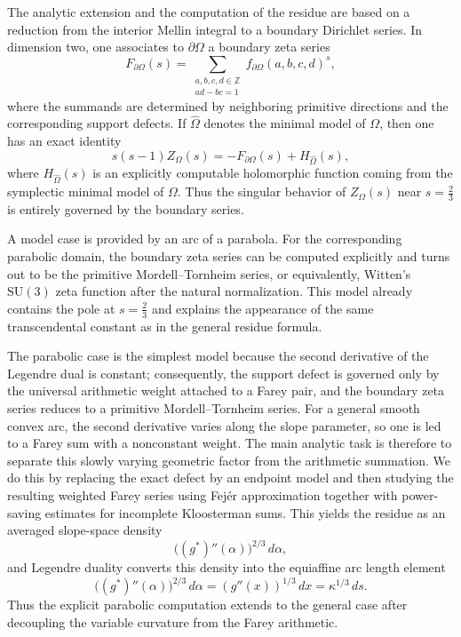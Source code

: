 \documentclass[a4paper,american,11pt]{amsart}
\theoremstyle{plain}
\theoremstyle{definition}
\newcommand{\Z}{\mathbb Z}
\begin{document}
The analytic extension and the computation of the residue are based on a
reduction from the interior Mellin integral to a boundary Dirichlet series. In
dimension two, one associates to \(\partial\Omega\) a boundary zeta series
\[
F_{\partial\Omega}(s)
=
\sum_{\substack{a,b,c,d\in\Z\\ ad-bc=1}}
f_{\partial\Omega}(a,b,c,d)^s,
\]
where the summands are determined by neighboring primitive directions and the
corresponding support defects. If \(\widehat\Omega\) denotes the minimal model
of \(\Omega\), then one has an exact identity
\[
s(s-1)Z_\Omega(s)
=
-
F_{\partial\Omega}(s)+H_{\widehat\Omega}(s),
\]
where \(H_{\widehat\Omega}(s)\) is an explicitly computable holomorphic
function coming from the symplectic minimal model of \(\Omega\). Thus the
singular behavior of \(Z_\Omega(s)\) near \(s=\frac{2}{3}\) is entirely
governed by the boundary series.

A model case is provided by an arc of a parabola. For the corresponding
parabolic domain, the boundary zeta series can be computed explicitly and
turns out to be the primitive Mordell--Tornheim series, or equivalently,
Witten's \(\mathrm{SU}(3)\) zeta function after the natural normalization. This model
already contains the pole at \(s=\tfrac23\) and explains the appearance of the
same transcendental constant as in the general residue formula.

The parabolic case is the simplest model because the second derivative of the
Legendre dual is constant; consequently, the support defect is governed only
by the universal arithmetic weight attached to a Farey pair, and the boundary
zeta series reduces to a primitive Mordell--Tornheim series. For a general
smooth convex arc, the second derivative varies along the slope parameter, so
one is led to a Farey sum with a nonconstant weight. The main analytic task is
therefore to separate this slowly varying geometric factor from the arithmetic
summation. We do this by replacing the exact defect by an endpoint model and
then studying the resulting weighted Farey series using Fej\'er approximation
together with power-saving estimates for incomplete Kloosterman sums. This
yields the residue as an averaged slope-space density
\[
\bigl((g^\ast)''(\alpha)\bigr)^{2/3}\,d\alpha,
\]
and Legendre duality converts this density into the equiaffine arc length
element
\[
\bigl((g^\ast)''(\alpha)\bigr)^{2/3}\,d\alpha
=
(g''(x))^{1/3}\,dx
=
\kappa^{1/3}\,ds.
\]
Thus the explicit parabolic computation extends to the general case after
decoupling the variable curvature from the Farey arithmetic.
\end{document}
